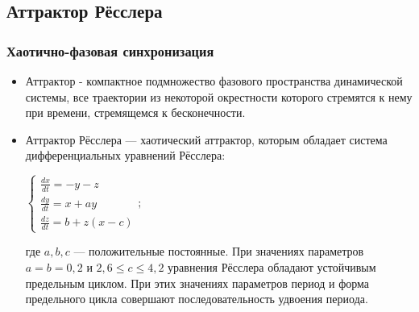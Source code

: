 \documentclass{beamer}
\begin{document}
\subsection{Аттрактор Рёсслера} %

\begin{frame}
\frametitle{Хаотично-фазовая синхронизация}

\begin{itemize}
\item[]Аттрактор - компактное подмножество фазового пространства динамической системы, все траектории из некоторой окрестности которого стремятся к нему при времени, стремящемся к бесконечности.
\bigskip
\item[]Аттрактор Рёсслера — хаотический аттрактор, которым обладает система дифференциальных уравнений Рёсслера:

\begin{center}
$\left \{ \begin{matrix} \frac{dx}{dt} = -y - z \\ \frac{dy}{dt} = x + ay \\ \frac{dz}{dt} = b + z(x-c) \end{matrix} \right.  ;$
\end{center}

где $a, b, c$  — положительные постоянные. При значениях параметров $a = b = 0,2$ и $2,6 \le c \le 4,2$ уравнения Рёсслера обладают устойчивым предельным циклом. При этих значениях параметров период и форма предельного цикла совершают последовательность удвоения периода.
\end{itemize}

\end{frame}

\end{document}
